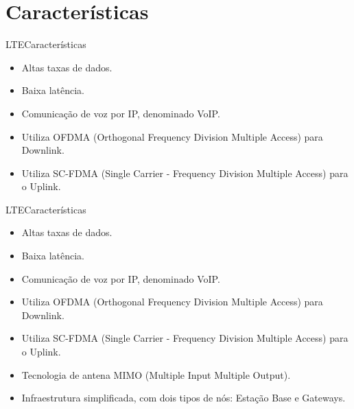 \documentclass[10pt]{beamer}
\begin{document}
\section{Características}
\begin{frame}{LTE}{Características}
    \begin{itemize}
        \item Altas taxas de dados.
        \item Baixa latência.
        \item Comunicação de voz por IP, denominado VoIP.
        \item Utiliza OFDMA (Orthogonal Frequency Division Multiple Access) para Downlink.
        \item Utiliza SC-FDMA (Single Carrier - Frequency Division Multiple Access) para o Uplink.
    \end{itemize}
\end{frame}
\begin{frame}{LTE}{Características}
    \begin{itemize}
        \item Altas taxas de dados.
        \item Baixa latência.
        \item Comunicação de voz por IP, denominado VoIP.
        \item Utiliza OFDMA (Orthogonal Frequency Division Multiple Access) para Downlink.
        \item Utiliza SC-FDMA (Single Carrier - Frequency Division Multiple Access) para o Uplink.
        \item Tecnologia de antena MIMO (Multiple Input Multiple Output).
        \item Infraestrutura simplificada, com dois tipos de nós: Estação Base e Gateways.
    \end{itemize}
\end{frame}

\end{document}
